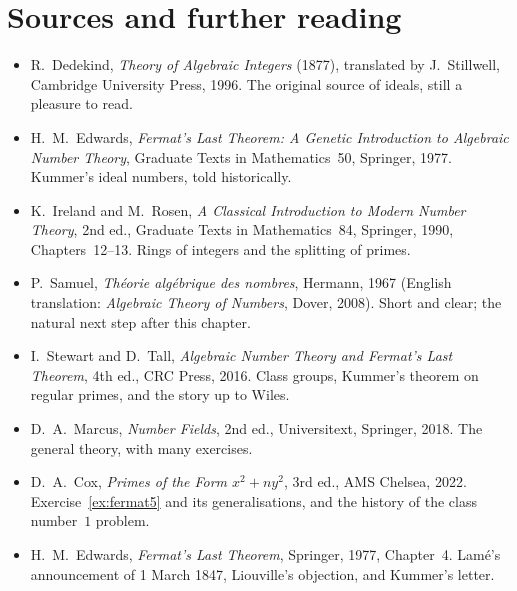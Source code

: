 \section*{Sources and further reading}

\begin{itemize}
\item R.~Dedekind, \emph{Theory of Algebraic Integers} (1877), translated by J.~Stillwell, Cambridge University Press, 1996. The original source of ideals, still a pleasure to read.
\item H.~M.~Edwards, \emph{Fermat's Last Theorem: A Genetic Introduction to Algebraic Number Theory}, Graduate Texts in Mathematics~50, Springer, 1977. Kummer's ideal numbers, told historically.
\item K.~Ireland and M.~Rosen, \emph{A Classical Introduction to Modern Number Theory}, 2nd ed., Graduate Texts in Mathematics~84, Springer, 1990, Chapters~12--13. Rings of integers and the splitting of primes.
\item P.~Samuel, \emph{Th\'eorie alg\'ebrique des nombres}, Hermann, 1967 (English translation: \emph{Algebraic Theory of Numbers}, Dover, 2008). Short and clear; the natural next step after this chapter.
\item I.~Stewart and D.~Tall, \emph{Algebraic Number Theory and Fermat's Last Theorem}, 4th ed., CRC Press, 2016. Class groups, Kummer's theorem on regular primes, and the story up to Wiles.
\item D.~A.~Marcus, \emph{Number Fields}, 2nd ed., Universitext, Springer, 2018. The general theory, with many exercises.
\item D.~A.~Cox, \emph{Primes of the Form $x^2+ny^2$}, 3rd ed., AMS Chelsea, 2022. Exercise~\ref{ex:fermat5} and its generalisations, and the history of the class number~$1$ problem.
\item H.~M.~Edwards, \emph{Fermat's Last Theorem}, Springer, 1977, Chapter~4. Lam\'e's announcement of 1 March 1847, Liouville's objection, and Kummer's letter.
\end{itemize}
